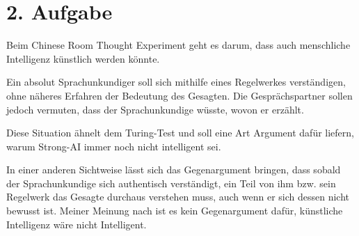 \documentclass{article}
\begin{document}
\section*{2. Aufgabe}{
Beim Chinese Room Thought Experiment geht es darum, dass auch menschliche Intelligenz k\"unstlich werden k\"onnte.

Ein absolut Sprachunkundiger soll sich mithilfe eines Regelwerkes verst\"andigen, ohne n\"aheres Erfahren der Bedeutung des Gesagten. Die Gespr\"achspartner sollen jedoch vermuten, dass der Sprachunkundige w\"usste, wovon er erz\"ahlt.

Diese Situation \"ahnelt dem Turing-Test und soll eine Art Argument daf\"ur liefern, warum Strong-AI immer noch nicht intelligent sei.

In einer anderen Sichtweise l\"asst sich das Gegenargument bringen, dass sobald der Sprachunkundige sich authentisch verst\"andigt, ein Teil von ihm bzw. sein Regelwerk das Gesagte durchaus verstehen muss, auch wenn er sich dessen nicht bewusst ist. Meiner Meinung nach ist es kein Gegenargument daf\"ur, k\"unstliche Intelligenz w\"are nicht Intelligent.
}
\end{document}
